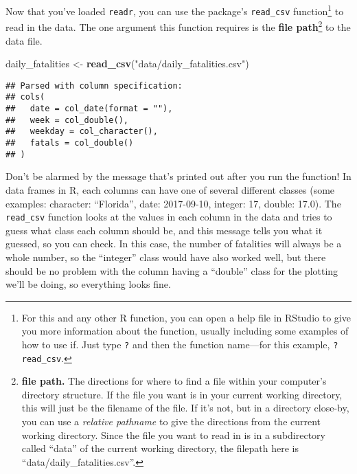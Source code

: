 \documentclass[]{tufte-book}
\newenvironment{Shaded}{}{}
\newcommand{\KeywordTok}[1]{\textcolor[rgb]{0.00,0.44,0.13}{\textbf{#1}}}
\newcommand{\NormalTok}[1]{#1}
\newcommand{\StringTok}[1]{\textcolor[rgb]{0.25,0.44,0.63}{#1}}
\begin{document}
Now that you've loaded \texttt{readr}, you can use the package's \texttt{read\_csv} function\footnote{For
  this and any other R function, you can open a help file in RStudio to give you
  more information about the function, usually including some examples of how to
  use if. Just type \texttt{?} and then the function name---for this example, \texttt{?read\_csv}.}
to read in the data. The one argument this function requires is the
\textbf{file path}\footnote{\textbf{file path.} The directions for where to find a file within your
  computer's directory structure. If the file you want is in your current working
  directory, this will just be the filename of the file. If it's not, but in a directory
  close-by, you can use a \emph{relative pathname} to give the directions from the current
  working directory. Since the file you want to read in is in a subdirectory called
  ``data'' of the current working directory, the filepath here is
  ``data/daily\_fatalities.csv''.}
to the data file.

\begin{Shaded}
\begin{Highlighting}[]
\NormalTok{daily_fatalities <-}\StringTok{ }\KeywordTok{read_csv}\NormalTok{(}\StringTok{"data/daily_fatalities.csv"}\NormalTok{)}
\end{Highlighting}
\end{Shaded}

\begin{verbatim}
## Parsed with column specification:
## cols(
##   date = col_date(format = ""),
##   week = col_double(),
##   weekday = col_character(),
##   fatals = col_double()
## )
\end{verbatim}

Don't be alarmed by the message that's printed out after you run the function!
In data frames in R, each columns can have one of several different classes
(some examples: character: ``Florida'', date: 2017-09-10, integer: 17,
double: 17.0). The \texttt{read\_csv} function looks at the values in each column in the
data and tries to guess what class each column should be, and this message
tells you what it guessed, so you can check. In this case, the number of
fatalities will always be a whole number, so the ``integer'' class would have
also worked well, but there should be no problem with the column having a
``double'' class for the plotting we'll be doing, so everything looks fine.
\end{document}
